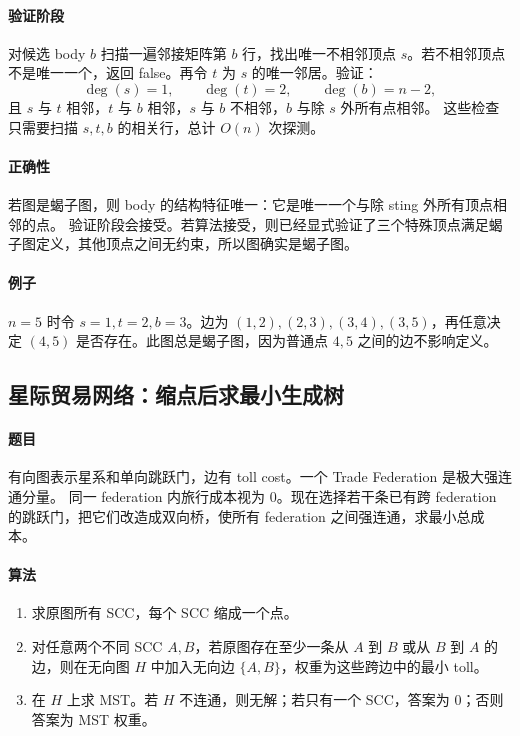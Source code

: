 \documentclass[UTF8,openany,12pt]{ctexbook}
\theoremstyle{remark}
\begin{document}
\paragraph{验证阶段}
对候选 body $b$ 扫描一遍邻接矩阵第 $b$ 行，找出唯一不相邻顶点 $s$。若不相邻顶点不是唯一一个，返回 false。再令 $t$ 为 $s$ 的唯一邻居。验证：
\[
  \deg(s)=1,\qquad \deg(t)=2,\qquad \deg(b)=n-2,
\]
且 $s$ 与 $t$ 相邻，$t$ 与 $b$ 相邻，$s$ 与 $b$ 不相邻，$b$ 与除 $s$ 外所有点相邻。
这些检查只需要扫描 $s,t,b$ 的相关行，总计 $O(n)$ 次探测。

\paragraph{正确性}
若图是蝎子图，则 body 的结构特征唯一：它是唯一一个与除 sting 外所有顶点相邻的点。
验证阶段会接受。若算法接受，则已经显式验证了三个特殊顶点满足蝎子图定义，其他顶点之间无约束，所以图确实是蝎子图。

\paragraph{例子}
$n=5$ 时令 $s=1,t=2,b=3$。边为 $(1,2),(2,3),(3,4),(3,5)$，再任意决定
$(4,5)$ 是否存在。此图总是蝎子图，因为普通点 $4,5$ 之间的边不影响定义。

\subsection{星际贸易网络：缩点后求最小生成树}

\paragraph{题目}
有向图表示星系和单向跳跃门，边有 toll cost。一个 Trade Federation 是极大强连通分量。
同一 federation 内旅行成本视为 $0$。现在选择若干条已有跨 federation 的跳跃门，把它们改造成双向桥，使所有 federation 之间强连通，求最小总成本。

\paragraph{算法}
\begin{enumerate}
  \item 求原图所有 SCC，每个 SCC 缩成一个点。
  \item 对任意两个不同 SCC $A,B$，若原图存在至少一条从 $A$ 到 $B$ 或从 $B$ 到 $A$ 的边，则在无向图 $H$ 中加入无向边 $\{A,B\}$，权重为这些跨边中的最小 toll。
  \item 在 $H$ 上求 MST。若 $H$ 不连通，则无解；若只有一个 SCC，答案为 $0$；否则答案为 MST 权重。
\end{enumerate}
\end{document}
